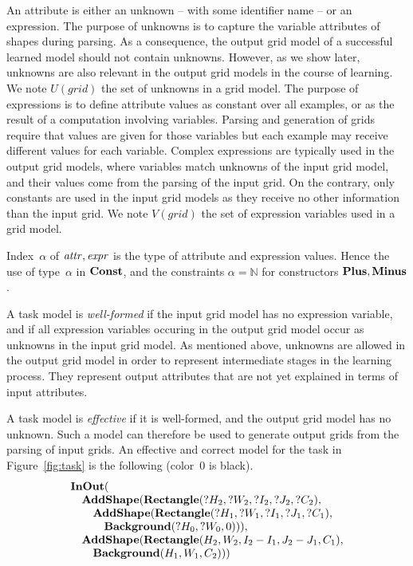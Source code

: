 \documentclass[a4paper]{llncs}
\newcommand{\nat}{\mathbb{N}}
\begin{document}
An attribute is either an unknown -- with some identifier name -- or
an expression. The purpose of unknowns is to capture the variable
attributes of shapes during parsing. As a consequence, the output grid
model of a successful learned model should not contain
unknowns. However, as we show later, unknowns are also relevant in the
output grid models in the course of learning. We note $U(grid)$ the
set of unknowns in a grid model.
%
The purpose of expressions is to define attribute values as constant
over all examples, or as the result of a computation involving
variables. Parsing and generation of grids require that values are
given for those variables but each example may receive different
values for each variable. Complex expressions are typically used in
the output grid models, where variables match unknowns of the input
grid model, and their values come from the parsing of the input
grid. On the contrary, only constants are used in the input grid
models as they receive no other information than the input grid.  We
note $V(grid)$ the set of expression variables used in a grid model.

Index~$\alpha$ of ${\it attr}, {\it expr}$ is the type of attribute
and expression values. Hence the use of type~$\alpha$ in
${\bf Const}$, and the constraints $\alpha = \nat$ for constructors
${\bf Plus}, {\bf Minus}$.

A task model is {\em well-formed} if the input grid model has no
expression variable, and if all expression variables occuring in the
output grid model occur as unknowns in the input grid model. As
mentioned above, unknowns are allowed in the output grid model in
order to represent intermediate stages in the learning process. They
represent output attributes that are not yet explained in terms of
input attributes.

A task model is {\em effective} if it is well-formed, and the output
grid model has no unknown. Such a model can therefore be used to
generate output grids from the parsing of input grids. An effective
and correct model for the task in Figure~\ref{fig:task} is the
following (color~0 is black).
\[\begin{array}{l}
{\bf InOut}( \\
\quad {\bf AddShape}({\bf Rectangle}(?H_2,?W_2,?I_2,?J_2,?C_2), \\
\quad \quad {\bf AddShape}({\bf Rectangle}(?H_1,?W_1,?I_1,?J_1,?C_1), \\
\quad \quad \quad {\bf Background}(?H_0,?W_0,0))), \\
\quad {\bf AddShape}({\bf Rectangle}(H_2,W_2,I_2-I_1,J_2-J_1,C_1), \\
\quad \quad  {\bf Background}(H_1,W_1,C_2))) \\
  \end{array}\]
\end{document}
